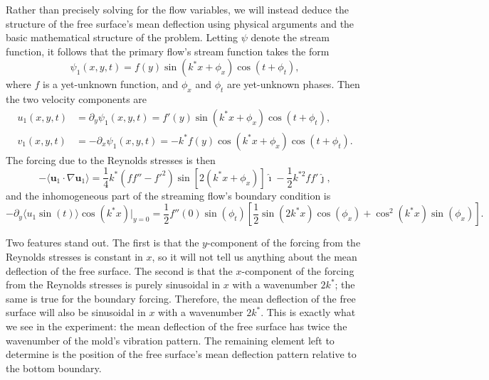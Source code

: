 \documentclass[letter,11pt]{article}
\begin{document}
Rather than precisely solving for the flow variables, we will instead deduce the structure of the free surface's mean deflection using physical arguments and the basic mathematical structure of the problem. Letting $\psi$ denote the stream function, it follows that the primary flow's stream function takes the form
\begin{equation}
    \psi_1(x,y,t) = f(y)\sin(k^* x + \phi_x)\cos(t + \phi_t),
\end{equation}
where $f$ is a yet-unknown function, and $\phi_x$ and $\phi_t$ are yet-unknown phases. Then the two velocity components are
\begin{align}
    u_1(x,y,t) &= \partial_y \psi_1(x,y,t) = f'(y) \sin(k^*x + \phi_x)\cos(t + \phi_t), \\
    v_1(x,y,t) &= -\partial_x \psi_1(x,y,t) = -k^* f(y)\cos(k^*x + \phi_x)\cos(t + \phi_t).
\end{align}
The forcing due to the Reynolds stresses is then 
\begin{equation}
    -\langle \mathbf{u}_1 \cdot \nabla \mathbf{u}_1 \rangle = \frac{1}{4} k^*(ff'' - f'^2) \sin[2(k^*x + \phi_x)] \hat{\imath} - \frac{1}{2}k^{*2}ff' \hat{\jmath},
\end{equation}
and the inhomogeneous part of the streaming flow's boundary condition is
\begin{equation}
    -\partial_y \langle u_1 \sin(t) \rangle \cos(k^*x)\vert_{y=0} = \frac{1}{2} f''(0) \sin(\phi_t)\left[\frac{1}{2} \sin(2k^*x)\cos(\phi_x) + \cos^2(k^*x)\sin(\phi_x)\right].
\end{equation}

Two features stand out. The first is that the $y$-component of the forcing from the Reynolds stresses is constant in $x$, so it will not tell us anything about the mean deflection of the free surface. The second is that the $x$-component of the forcing from the Reynolds stresses is purely sinusoidal in $x$ with a wavenumber $2k^*$; the same is true for the boundary forcing. Therefore, the mean deflection of the free surface will also be sinusoidal in $x$ with a wavenumber $2k^*$. This is exactly what we see in the experiment: the mean deflection of the free surface has twice the wavenumber of the mold's vibration pattern. The remaining element left to determine is the position of the free surface's mean deflection pattern relative to the bottom boundary. 
\end{document}
